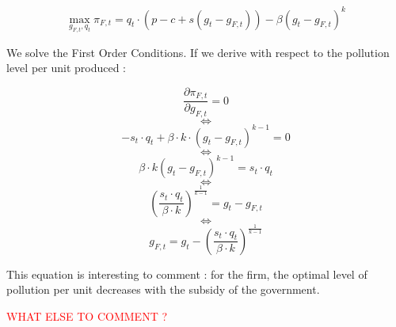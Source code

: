 \documentclass{article}
\begin{document}
$$
    \max_{g_{F,t},q_{t}}{\pi_{F,t}=q_{t}\cdot\left(p-c+s(g_{t}-g_{F,t})\right)-\beta(g_{t}-g_{F,t})^{k}}
$$

We solve the First Order Conditions. If we derive with respect to the pollution level per unit produced : 

$$\frac{\partial \pi_{F,t}}{\partial g_{F,t}}=0$$
$$\iff$$
$$-s_{t}\cdot q_t+\beta\cdot k\cdot(g_{t}-g_{F,t})^{k-1}=0$$
$$\iff$$
$$\beta\cdot k(g_{t}-g_{F,t})^{k-1}=s_{t}\cdot q_{t}$$
$$\iff$$
$$\left(\frac{s_{t}\cdot q_{t}}{\beta\cdot k}\right)^{\frac{1}{k-1}}=g_{t}-g_{F,t}$$
$$\iff$$
\begin{equation}
    g_{F,t}=g_{t}-\left(\frac{s_{t}\cdot q_{t}}{\beta\cdot k}\right)^{\frac{1}{k-1}}
\end{equation}

This equation is interesting to comment : for the firm, the optimal level of pollution per unit decreases with the subsidy of the government.

\textcolor{red}{WHAT ELSE TO COMMENT ?}
\end{document}
